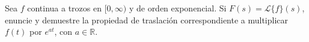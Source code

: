 Sea $f$ continua a trozos en $[0,\infty)$ y de orden exponencial. Si $F(s)=\mathcal L\{f\}(s)$, enuncie y demuestre la propiedad de traslación correspondiente a multiplicar $f(t)$ por $e^{at}$, con $a\in\mathbb R$.
